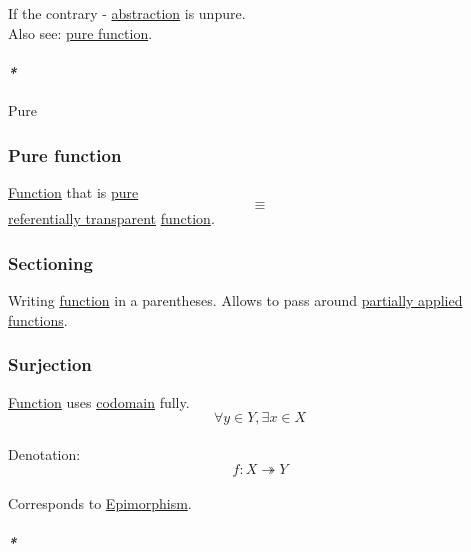 \documentclass[11pt]{article}
\begin{document}
If the contrary - \hyperref[orgd787547]{abstraction} is unpure.\\

Also see: \hyperref[org801b478]{pure function}.\\

\paragraph{\emph{*}}
\label{sec:org7f0d85f}

\label{org08c21de}Pure\\

\subsubsection{\label{org801b478}Pure function}
\label{sec:org2591770}

\hyperref[orgeb5cddb]{Function} that is \hyperref[org08c21de]{pure} $$ \equiv $$ \hyperref[org5256c2f]{referentially transparent} \hyperref[orgeb5cddb]{function}.\\

\subsubsection{\label{org53a826d}Sectioning}
\label{sec:org927f006}
Writing \hyperref[orgeb5cddb]{function} in a parentheses. Allows to pass around \hyperref[orgd8b581f]{partially applied} \hyperref[org66c5288]{functions}.\\

\subsubsection{\label{org68e46b5}Surjection}
\label{sec:orga28bcc8}
\hyperref[orgeb5cddb]{Function} uses \hyperref[orgee70232]{codomain} fully.\\

$$ \forall y \in Y, \exists x \in X $$\\

Denotation:\\
$$ f : X \twoheadrightarrow Y $$\\

Corresponds to \hyperref[org2e893f9]{Epimorphism}.\\

\paragraph{\emph{*}}
\label{sec:org2cbfc22}
\end{document}

